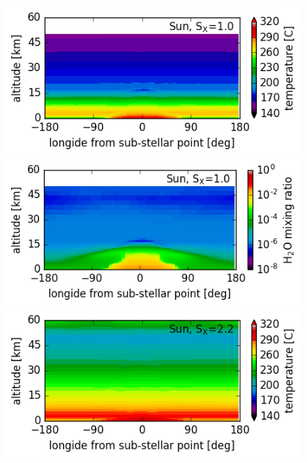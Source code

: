 \documentclass[11pt,numberedappendix,twocolappendix,]{emulateapj}
\begin{document}
\begin{figure}[!hbt]
  \begin{minipage}{0.48\hsize}
    \begin{center}
\includegraphics[width=\hsize]{fig/ANN0007-0010aijlAqOH0TLS_SunS10P365L40Q_temp.png}
    \end{center}
 \end{minipage}
   \begin{minipage}{0.48\hsize}
    \begin{center}
\includegraphics[width=\hsize]{fig/ANN0007-0010aijlAqOH0TLS_SunS10P365L40Q_xH2O.png}
    \end{center}
 \end{minipage}
  \begin{minipage}{0.48\hsize}
    \begin{center}
\includegraphics[width=\hsize]{fig/ANN0006-0012aijlAqOH0TLS_SunS22P202L40Q_temp.png}

\end{center}
\end{minipage}
\end{figure}
\end{document}
